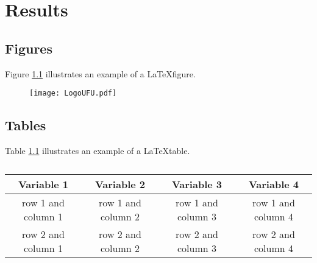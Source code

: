 \chapter{Results} 
\label{ChapterResults}

\section{Figures}

Figure \ref{fig:MyFigure} illustrates an example of a \LaTeX figure.

\begin{figure}[!htbp]
\centering
\texttt{[image: LogoUFU.pdf]}
\caption{\lipsum[1][1-3]}
\label{fig:MyFigure}
\end{figure}

\section{Tables}

Table \ref{tab:MyTable} illustrates an example of a \LaTeX table.

\begin{table}[!h]
\centering
\caption{\lipsum[1][1-2]} 
\label{tab:MyTable}
\begin{tabularx}{\textwidth}{c|c|cc}\toprule
Variable 1  & Variable 2 & Variable 3 & Variable 4 \\ \midrule
row 1 and column 1  & row 1 and column 2 & row 1 and column 3 & row 1 and column 4 \\
row 2 and column 1  & row 2 and column 2 & row 2 and column 3 & row 2 and column 4 \\
 \bottomrule
\end{tabularx}
\end{table}
